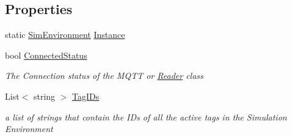 \subsection*{Properties}
\begin{DoxyCompactItemize}
\item 
static \hyperlink{class_pozyx_positioner_1_1_framework_1_1_sim_environment}{Sim\+Environment} \hyperlink{class_pozyx_positioner_1_1_framework_1_1_sim_environment_a099b83d9b2af93ae755b7bd081bef37c}{Instance}
\item 
bool \hyperlink{class_pozyx_positioner_1_1_framework_1_1_sim_environment_ae0d0d204695b423669bd6d0593d961aa}{Connected\+Status}
\begin{DoxyCompactList}\small\item\em The Connection status of the M\+Q\+TT or \hyperlink{class_pozyx_positioner_1_1_framework_1_1_reader}{Reader} class \end{DoxyCompactList}\item 
List$<$ string $>$ \hyperlink{class_pozyx_positioner_1_1_framework_1_1_sim_environment_af1e5db7ec810b6d92216b74c3eeb657a}{Tag\+I\+Ds}
\begin{DoxyCompactList}\small\item\em a list of strings that contain the I\+Ds of all the active tags in the Simulation Environment \end{DoxyCompactList}\end{DoxyCompactItemize}

